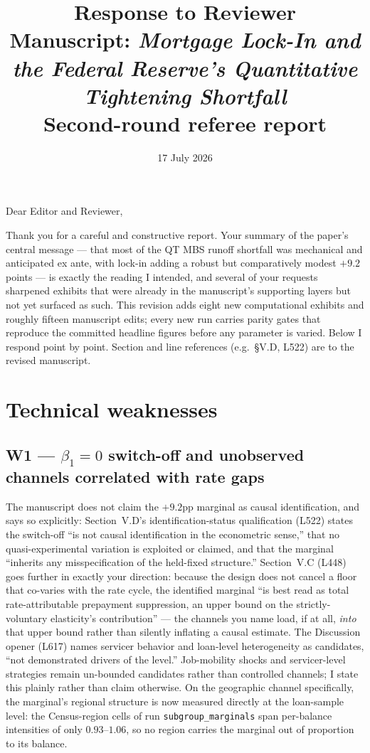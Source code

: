 \documentclass[11pt]{article}
\title{\vspace{-2em}Response to Reviewer\\[0.3em]
\large Manuscript: \emph{Mortgage Lock-In and the Federal Reserve's
Quantitative Tightening Shortfall}\\[0.2em]
\normalsize Second-round referee report}
\author{}
\date{17 July 2026}
\newcommand{\run}[1]{\texttt{#1}}
\begin{document}
\sloppy
\maketitle
\vspace{-2.5em}

Dear Editor and Reviewer,

Thank you for a careful and constructive report. Your summary of the paper's
central message --- that most of the QT MBS runoff shortfall was mechanical
and anticipated ex ante, with lock-in adding a robust but comparatively
modest $+9.2$ points --- is exactly the reading I intended, and several of
your requests sharpened exhibits that were already in the manuscript's
supporting layers but not yet surfaced as such. This revision adds eight new
computational exhibits and roughly fifteen manuscript edits; every new run
carries parity gates that reproduce the committed headline figures before any
parameter is varied. Below I respond point by point. Section and line
references (e.g.\ \S V.D, L522) are to the revised manuscript.

\section*{Technical weaknesses}

\subsection*{W1 --- $\beta_1=0$ switch-off and unobserved channels correlated with rate gaps}

The manuscript does not claim the $+9.2$pp marginal as causal identification,
and says so explicitly: Section~V.D's identification-status qualification
(L522) states the switch-off ``is not causal identification in the
econometric sense,'' that no quasi-experimental variation is exploited or
claimed, and that the marginal ``inherits any misspecification of the
held-fixed structure.'' Section~V.C (L448) goes further in exactly your
direction: because the design does not cancel a floor that co-varies with the
rate cycle, the identified marginal ``is best read as total rate-attributable
prepayment suppression, an upper bound on the strictly-voluntary elasticity's
contribution'' --- the channels you name load, if at all, \emph{into} that
upper bound rather than silently inflating a causal estimate. The Discussion
opener (L617) names servicer behavior and loan-level heterogeneity as
candidates, ``not demonstrated drivers of the level.'' Job-mobility shocks and
servicer-level strategies remain un-bounded candidates rather than controlled
channels; I state this plainly rather than claim otherwise. On the geographic
channel specifically, the marginal's regional structure is now measured
directly at the loan-sample level: the Census-region cells of run
\run{subgroup\_marginals} span per-balance intensities of only $0.93$--$1.06$,
so no region carries the marginal out of proportion to its balance.
\end{document}
